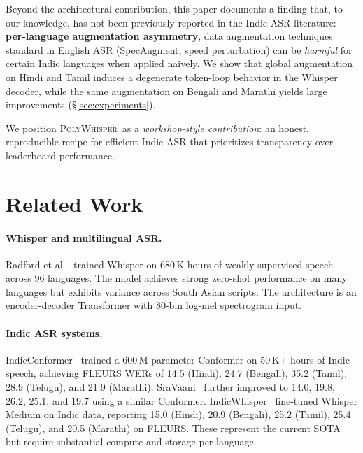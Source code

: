 \documentclass[11pt,a4paper]{article}
\newcommand{\poly}{\textsc{PolyWhisper}}
\begin{document}
Beyond the architectural contribution, this paper documents a finding that, to our knowledge, has not been previously reported in the Indic ASR literature:
\textbf{per-language augmentation asymmetry}, data augmentation techniques standard in English ASR (SpecAugment, speed perturbation) can be \emph{harmful} for certain Indic languages when applied naively.
We show that global augmentation on Hindi and Tamil induces a degenerate token-loop behavior in the Whisper decoder, while the same augmentation on Bengali and Marathi yields large improvements (\S\ref{sec:experiments}).

We position \poly\ as a \emph{workshop-style contribution}: an honest, reproducible recipe for efficient Indic ASR that prioritizes transparency over leaderboard performance.

\section{Related Work}

\paragraph{Whisper and multilingual ASR.}
Radford et al.~\cite{radford2023robust} trained Whisper on 680\,K hours of weakly supervised speech across 96 languages.
The model achieves strong zero-shot performance on many languages but exhibits variance across South Asian scripts.
The architecture is an encoder-decoder Transformer with 80-bin log-mel spectrogram input.

\paragraph{Indic ASR systems.}
IndicConformer~\cite{chiu2022indicconformer} trained a 600\,M-parameter Conformer on 50\,K+ hours of Indic speech, achieving FLEURS WERs of 14.5 (Hindi), 24.7 (Bengali), 35.2 (Tamil), 28.9 (Telugu), and 21.9 (Marathi).
SraVaani~\cite{pulikodan2026sravaani} further improved to 14.0, 19.8, 26.2, 25.1, and 19.7 using a similar Conformer.
IndicWhisper~\cite{nandyala2025indicwhisper} fine-tuned Whisper Medium on Indic data, reporting 15.0 (Hindi), 20.9 (Bengali), 25.2 (Tamil), 25.4 (Telugu), and 20.5 (Marathi) on FLEURS.
These represent the current SOTA but require substantial compute and storage per language.
\end{document}
